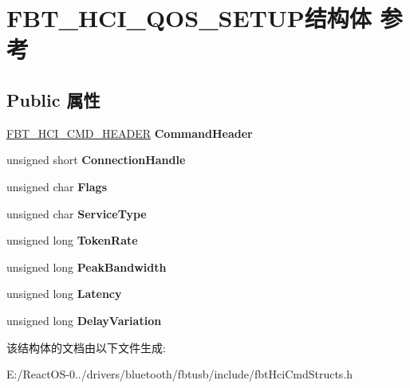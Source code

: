 \hypertarget{struct_f_b_t___h_c_i___q_o_s___s_e_t_u_p}{}\section{F\+B\+T\+\_\+\+H\+C\+I\+\_\+\+Q\+O\+S\+\_\+\+S\+E\+T\+U\+P结构体 参考}
\label{struct_f_b_t___h_c_i___q_o_s___s_e_t_u_p}
\subsection*{Public 属性}
\begin{DoxyCompactItemize}
\item 
\mbox{\label{struct_f_b_t___h_c_i___q_o_s___s_e_t_u_p_a1b7a39cee1d16979c1f0f890fb3d3555}} 
\hyperlink{struct_f_b_t___h_c_i___c_m_d___h_e_a_d_e_r}{F\+B\+T\+\_\+\+H\+C\+I\+\_\+\+C\+M\+D\+\_\+\+H\+E\+A\+D\+ER} {\bfseries Command\+Header}
\item 
\mbox{\label{struct_f_b_t___h_c_i___q_o_s___s_e_t_u_p_a28fb58d54e2c16a15db22c11b72ea01a}} 
unsigned short {\bfseries Connection\+Handle}
\item 
\mbox{\label{struct_f_b_t___h_c_i___q_o_s___s_e_t_u_p_afe634ea43bcb364dbed5966b1cd0696f}} 
unsigned char {\bfseries Flags}
\item 
\mbox{\label{struct_f_b_t___h_c_i___q_o_s___s_e_t_u_p_af9376b78b4daff02b27b657d530f1e2f}} 
unsigned char {\bfseries Service\+Type}
\item 
\mbox{\label{struct_f_b_t___h_c_i___q_o_s___s_e_t_u_p_aae771bcb9015adab5eb430582fd695c0}} 
unsigned long {\bfseries Token\+Rate}
\item 
\mbox{\label{struct_f_b_t___h_c_i___q_o_s___s_e_t_u_p_afccf5aadc840c6f25d4416df71ace527}} 
unsigned long {\bfseries Peak\+Bandwidth}
\item 
\mbox{\label{struct_f_b_t___h_c_i___q_o_s___s_e_t_u_p_a888798655e36476f53a6a15b09fa48fc}} 
unsigned long {\bfseries Latency}
\item 
\mbox{\label{struct_f_b_t___h_c_i___q_o_s___s_e_t_u_p_a6427ba526774d39e749190f778123126}} 
unsigned long {\bfseries Delay\+Variation}
\end{DoxyCompactItemize}


该结构体的文档由以下文件生成\+:\begin{DoxyCompactItemize}
\item 
E\+:/\+React\+O\+S-\/0../drivers/bluetooth/fbtusb/include/fbt\+Hci\+Cmd\+Structs.\+h\end{DoxyCompactItemize}
